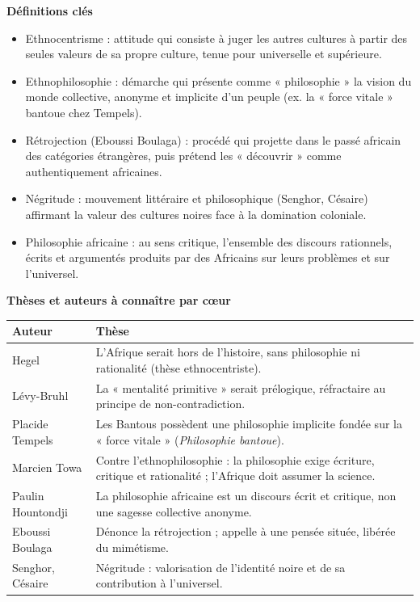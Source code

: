 \documentclass[11pt]{article}
\newcommand{\cle}[1]{{\popxbold\color{popdark}#1}}
\begin{document}
\begin{bilan}
\textbf{Définitions clés}
\begin{itemize}
  \item \cle{Ethnocentrisme} : attitude qui consiste à juger les autres cultures à partir des seules valeurs de sa propre culture, tenue pour universelle et supérieure.
  \item \cle{Ethnophilosophie} : démarche qui présente comme « philosophie » la vision du monde collective, anonyme et implicite d'un peuple (ex. la « force vitale » bantoue chez Tempels).
  \item \cle{Rétrojection} (Eboussi Boulaga) : procédé qui projette dans le passé africain des catégories étrangères, puis prétend les « découvrir » comme authentiquement africaines.
  \item \cle{Négritude} : mouvement littéraire et philosophique (Senghor, Césaire) affirmant la valeur des cultures noires face à la domination coloniale.
  \item \cle{Philosophie africaine} : au sens critique, l'ensemble des discours rationnels, écrits et argumentés produits par des Africains sur leurs problèmes et sur l'universel.
\end{itemize}

\textbf{Thèses et auteurs à connaître par cœur}
\begin{center}
\begin{tabularx}{\linewidth}{|l|X|}
\hline
\rowcolor{popblueL} \textbf{Auteur} & \textbf{Thèse} \\
\hline
Hegel & L'Afrique serait hors de l'histoire, sans philosophie ni rationalité (thèse ethnocentriste). \\
\hline
Lévy-Bruhl & La « mentalité primitive » serait prélogique, réfractaire au principe de non-contradiction. \\
\hline
Placide Tempels & Les Bantous possèdent une philosophie implicite fondée sur la « force vitale » (\emph{Philosophie bantoue}). \\
\hline
Marcien Towa & Contre l'ethnophilosophie : la philosophie exige écriture, critique et rationalité ; l'Afrique doit assumer la science. \\
\hline
Paulin Hountondji & La philosophie africaine est un discours écrit et critique, non une sagesse collective anonyme. \\
\hline
Eboussi Boulaga & Dénonce la rétrojection ; appelle à une pensée située, libérée du mimétisme. \\
\hline
Senghor, Césaire & Négritude : valorisation de l'identité noire et de sa contribution à l'universel. \\
\hline
\end{tabularx}
\end{center}


\end{bilan}
\end{document}
